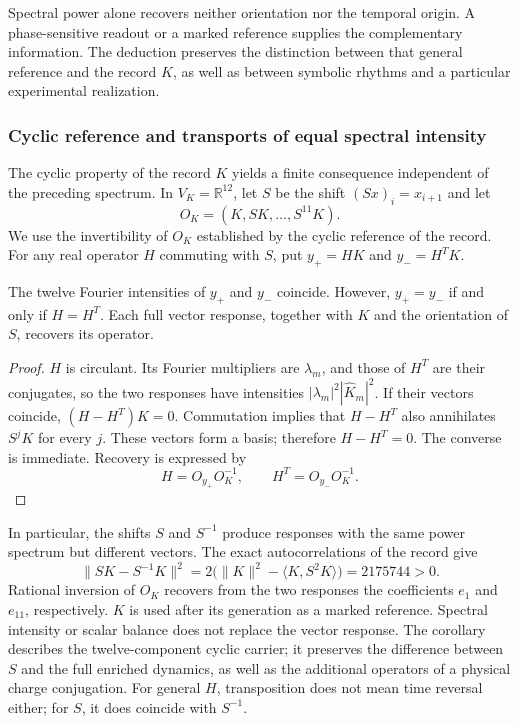 Spectral power alone recovers neither orientation nor the temporal
origin. A phase-sensitive readout or a marked reference supplies
the complementary information. The deduction preserves the distinction between
that general reference and the record $K$, as well as between symbolic rhythms
and a particular experimental realization.

\subsubsection{Cyclic reference and transports of equal spectral intensity}
\label{md:cron:k-ciclico}

The cyclic property of the record $K$ yields a finite consequence
independent of the preceding spectrum. In $V_K=\mathbb R^{12}$, let $S$ be the
shift $(Sx)_i=x_{i+1}$ and let
\begin{equation}
 O_K=(K,SK,\ldots,S^{11}K).
 \label{md:cron:matriz-ciclica}
\end{equation}
We use the invertibility of $O_K$ established by the cyclic reference
of the record. For any real operator $H$ commuting with $S$,
put $y_+=HK$ and $y_-=H^TK$.

\begin{proposition}
\label{md:cron:proposicion-intensidades}
The twelve Fourier intensities of $y_+$ and $y_-$ coincide.
However, $y_+=y_-$ if and only if $H=H^T$.
Each full vector response, together with $K$ and the orientation of $S$,
recovers its operator.
\end{proposition}
\begin{proof}
$H$ is circulant. Its Fourier multipliers are $\lambda_m$, and those
of $H^T$ are their conjugates, so the two responses have
intensities $|\lambda_m|^2|\widehat K_m|^2$.
If their vectors coincide, $(H-H^T)K=0$. Commutation implies that
$H-H^T$ also annihilates $S^jK$ for every $j$. These vectors form a basis;
therefore $H-H^T=0$. The converse is immediate.
Recovery is expressed by
\begin{equation}
 H=O_{y_+}O_K^{-1},\qquad
 H^T=O_{y_-}O_K^{-1}.
 \label{md:cron:restitucion-operador}
\end{equation}
\end{proof}

In particular, the shifts $S$ and $S^{-1}$ produce responses with
the same power spectrum but different vectors. The exact autocorrelations
of the record give
\begin{equation}
 \|SK-S^{-1}K\|^2
 =2\bigl(\|K\|^2-\langle K,S^2K\rangle\bigr)
 =2175744>0.
 \label{md:cron:separacion-desplazamientos}
\end{equation}
Rational inversion of $O_K$ recovers from the two responses the
coefficients $e_1$ and $e_{11}$, respectively. $K$ is used after
its generation as a marked reference. Spectral intensity or scalar
balance does not replace the vector response.
The corollary describes the twelve-component cyclic carrier;
it preserves the difference between $S$ and the full enriched dynamics,
as well as the additional operators of a physical charge conjugation.
For general $H$, transposition does not mean time reversal either;
for $S$, it does coincide with $S^{-1}$.

